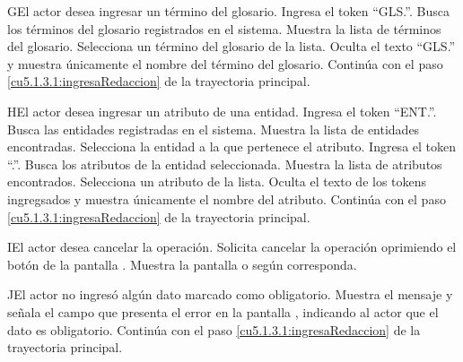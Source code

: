  \begin{UCtrayectoriaA}{G}{El actor desea ingresar un término del glosario.}
 	\UCpaso[\UCactor] Ingresa el token ``GLS.''.	
 	\UCpaso[\UCsist] Busca los términos del glosario registrados en el sistema. 
 	\UCpaso[\UCsist] Muestra la lista de términos del glosario.
 	\UCpaso[\UCactor] Selecciona un término del glosario de la lista.
  	\UCpaso[\UCsist] Oculta el texto ``GLS.'' y muestra únicamente el nombre del término del glosario.
    \UCpaso[] Continúa con el paso \ref{cu5.1.3.1:ingresaRedaccion} de la trayectoria principal.
 \end{UCtrayectoriaA}

 \begin{UCtrayectoriaA}{H}{El actor desea ingresar un atributo de una entidad.}
 	\UCpaso[\UCactor] Ingresa el token ``ENT.''.
 	\UCpaso[\UCsist] Busca las entidades registradas en el sistema. 
 	\UCpaso[\UCsist] Muestra la lista de entidades encontradas.
 	\UCpaso[\UCactor] Selecciona la entidad a la que pertenece el atributo.
  	\UCpaso[\UCactor] Ingresa el token ``.''.
  	\UCpaso[\UCsist] Busca los atributos de la entidad seleccionada.
  	\UCpaso[\UCsist] Muestra la lista de atributos encontrados.
 	\UCpaso[\UCactor] Selecciona un atributo de la lista.
  	\UCpaso[\UCsist] Oculta el texto de los tokens ingregsados y muestra únicamente el nombre del atributo.
    \UCpaso[] Continúa con el paso \ref{cu5.1.3.1:ingresaRedaccion} de la trayectoria principal.
 \end{UCtrayectoriaA}


 \begin{UCtrayectoriaA}{I}{El actor desea cancelar la operación.}
    \UCpaso[\UCactor] Solicita cancelar la operación oprimiendo el botón  de la pantalla .
    \UCpaso[\UCsist] Muestra la pantalla  o  según corresponda.
 \end{UCtrayectoriaA}
 
 \begin{UCtrayectoriaA}{J}{El actor no ingresó algún dato marcado como obligatorio.}
    \UCpaso[\UCsist] Muestra el mensaje  y señala el campo que presenta el error en la pantalla , indicando al actor que el dato es obligatorio.
    \UCpaso[] Continúa con el paso \ref{cu5.1.3.1:ingresaRedaccion} de la trayectoria principal.
 \end{UCtrayectoriaA}
 
